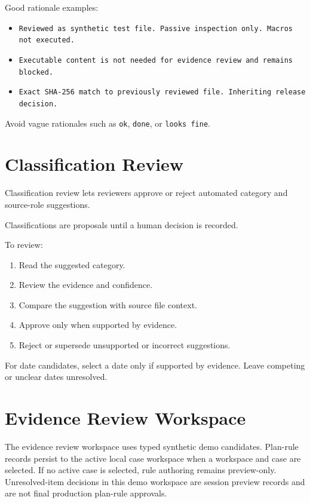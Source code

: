 Good rationale examples:

\begin{itemize}
  \item \texttt{Reviewed as synthetic test file. Passive inspection only. Macros not executed.}
  \item \texttt{Executable content is not needed for evidence review and remains blocked.}
  \item \texttt{Exact SHA-256 match to previously reviewed file. Inheriting release decision.}
\end{itemize}

Avoid vague rationales such as \texttt{ok}, \texttt{done}, or \texttt{looks fine}.

\section{Classification Review}

Classification review lets reviewers approve or reject automated category and source-role suggestions.

Classifications are proposals until a human decision is recorded.

To review:

\begin{enumerate}
  \item Read the suggested category.
  \item Review the evidence and confidence.
  \item Compare the suggestion with source file context.
  \item Approve only when supported by evidence.
  \item Reject or supersede unsupported or incorrect suggestions.
\end{enumerate}

For date candidates, select a date only if supported by evidence. Leave competing or unclear dates unresolved.

\section{Evidence Review Workspace}

The evidence review workspace uses typed synthetic demo candidates. Plan-rule records persist to the active local case workspace when a workspace and case are selected. If no active case is selected, rule authoring remains preview-only. Unresolved-item decisions in this demo workspace are session preview records and are not final production plan-rule approvals.

